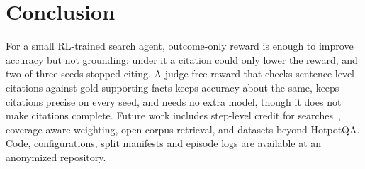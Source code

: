\documentclass[conference]{IEEEtran}
\newcommand{\coderepo}{an anonymized repository}
\newcommand{\coderepo}{\url{https://github.com/emrsyah/needle}}
\begin{document}
\section{Conclusion}
For a small RL-trained search agent, outcome-only reward is enough to improve accuracy but not grounding: under it a citation could only lower the reward, and two of three seeds stopped citing. A judge-free reward that checks sentence-level citations against gold supporting facts keeps accuracy about the same, keeps citations precise on every seed, and needs no extra model, though it does not make citations complete. Future work includes step-level credit for searches~\cite{xu2026stamp,wang2025stepsearch}, coverage-aware weighting, open-corpus retrieval, and datasets beyond HotpotQA. Code, configurations, split manifests and episode logs are available at \coderepo.



\end{document}
